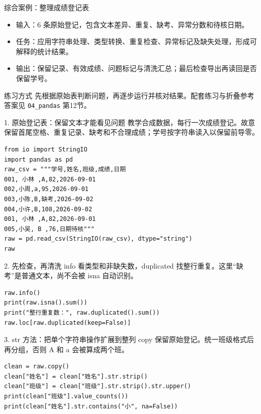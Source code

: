 \documentclass[9pt]{ctexbeamer}
\begin{document}
\begin{frame}{综合案例：整理成绩登记表}
\begin{itemize}
\item 输入：6 条原始登记，包含文本差异、重复、缺考、异常分数和待核日期。
\item 任务：应用字符串处理、类型转换、重复检查、异常标记及缺失处理，形成可解释的统计结果。
\item 输出：保留记录、有效成绩、问题标记与清洗汇总；最后检查导出再读回是否保留学号。
\end{itemize}
\begin{block}{练习方式}
先根据原始表判断问题，再逐步运行并核对结果。配套练习与折叠参考答案见 \texttt{04\_pandas} 第12节。
\end{block}
\end{frame}
\begin{frame}[fragile]{1. 原始登记表：保留文本才能看见问题}
\small 教学合成数据，每行一次成绩登记。故意保留首尾空格、重复记录、缺考和不合理成绩；学号按字符串读入以保留前导零。
\medskip
\begin{lstlisting}
from io import StringIO
import pandas as pd
raw_csv = """学号,姓名,班级,成绩,日期
001, 小林 ,A,82,2026-09-01
002,小周,a,95,2026-09-01
003,小陈,B,缺考,2026-09-02
004,小许,B,108,2026-09-02
001, 小林 ,A,82,2026-09-01
005,小吴, B ,76,日期待核"""
raw = pd.read_csv(StringIO(raw_csv), dtype="string")
raw
\end{lstlisting}
\end{frame}

\begin{frame}[fragile]{2. 先检查，再清洗}
\small info 看类型和非缺失数，duplicated 找整行重复。这里“缺考”是普通文本，尚不会被 isna 自动识别。
\medskip
\begin{lstlisting}
raw.info()
print(raw.isna().sum())
print("整行重复数：", raw.duplicated().sum())
raw.loc[raw.duplicated(keep=False)]
\end{lstlisting}
\end{frame}

\begin{frame}[fragile]{3. str 方法：把单个字符串操作扩展到整列}
\small copy 保留原始登记。统一班级格式后再分组，否则 A 和 a 会被算成两个班。
\medskip
\begin{lstlisting}
clean = raw.copy()
clean["姓名"] = clean["姓名"].str.strip()
clean["班级"] = clean["班级"].str.strip().str.upper()
print(clean["班级"].value_counts())
print(clean["姓名"].str.contains("小", na=False))
\end{lstlisting}
\end{frame}
\end{document}
